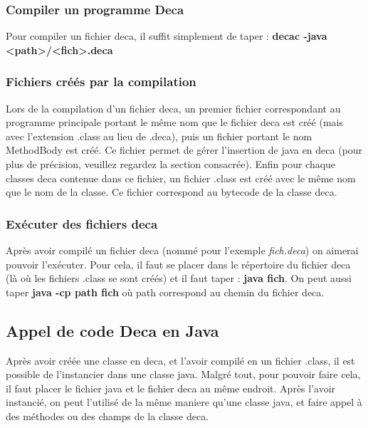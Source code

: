 \documentclass[12pt, a4paper, one side]{article}
\begin{document}
    \subsubsection{Compiler un programme Deca}

    Pour compiler un fichier deca, il suffit simplement de taper : \newline
    \textbf{decac -java <path>/<fich>.deca}

    \subsubsection{Fichiers créés par la compilation}

    Lors de la compilation d'un fichier deca, un premier fichier correspondant
    au programme principale portant le même nom que le fichier deca est créé (mais
    avec l'extension .class au lieu de .deca), puis un fichier portant le nom
    MethodBody est créé. Ce fichier permet de gérer l'insertion de java en deca
    (pour plus de précision, veuillez regardez la section consacrée). Enfin pour
    chaque classes deca contenue dans ce fichier, un fichier .class est créé avec
    le même nom que le nom de la classe. Ce fichier correspond au bytecode de la
    classe deca.

    \subsubsection{Exécuter des fichiers deca}

    Après avoir compilé un fichier deca (nommé pour l'exemple \textit{fich.deca})
    on aimerai pouvoir l'exécuter. Pour cela, il faut se placer dans le répertoire
    du fichier deca (là où les fichiers .class se sont créés) et il faut taper :
    \newline \textbf{java fich}. On peut aussi taper \textbf{java -cp path fich} où path correspond au chemin du fichier deca.

    \subsection{Appel de code Deca en Java}

    Après avoir créée une classe en deca, et l'avoir compilé en un fichier .class,
    il est possible de l'instancier dans une classe java. Malgré tout, pour pouvoir
    faire cela, il faut placer le fichier java et le fichier deca au même endroit.
    Après l'avoir instancié, on peut l'utilisé de la même maniere qu'une classe
    java, et faire appel à des méthodes ou des champs de la classe deca.
\end{document}
